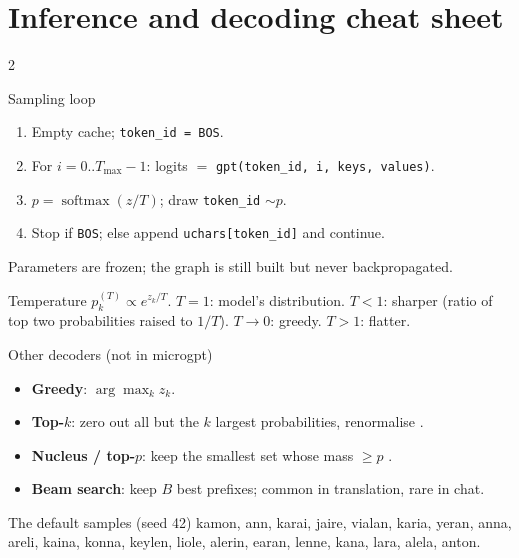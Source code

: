 \documentclass[10pt,letterpaper]{article}
\newcommand{\code}[1]{\lstinline[basicstyle=\ttfamily\small]|#1|}
\newcommand{\softmax}{\operatorname{softmax}}
\newcommand{\BOS}{\texttt{BOS}}
\begin{document}
\clearpage
\section{Inference and decoding cheat sheet}

\begin{multicols}{2}
\begin{cs}{Sampling loop}
\begin{enumerate}
  \item Empty cache; \code{token_id = BOS}.
  \item For $i = 0..T_{\max}-1$: logits $=$ \code{gpt(token_id, i, keys, values)}.
  \item $p = \softmax(z/T)$; draw \code{token_id} $\sim p$.
  \item Stop if \BOS; else append \code{uchars[token_id]} and continue.
\end{enumerate}
Parameters are frozen; the graph is still built but never backpropagated.
\end{cs}

\begin{cs}{Temperature}
$p_k^{(T)} \propto e^{z_k/T}$. $T=1$: model's distribution. $T<1$: sharper (ratio of top two probabilities raised to $1/T$). $T\to0$: greedy. $T>1$: flatter.
\end{cs}

\begin{cs}{Other decoders (not in microgpt)}
\begin{itemize}
  \item \textbf{Greedy}: $\arg\max_k z_k$.
  \item \textbf{Top-$k$}: zero out all but the $k$ largest probabilities, renormalise \parencite{fan2018hierarchical}.
  \item \textbf{Nucleus / top-$p$}: keep the smallest set whose mass $\ge p$ \parencite{holtzman2020nucleus}.
  \item \textbf{Beam search}: keep $B$ best prefixes; common in translation, rare in chat.
\end{itemize}
\end{cs}

\columnbreak

\begin{csb}{The default samples (seed 42)}
kamon, ann, karai, jaire, vialan, karia, yeran, anna, areli, kaina, konna, keylen, liole, alerin, earan, lenne, kana, lara, alela, anton.
\end{csb}


\end{multicols}
\end{document}
